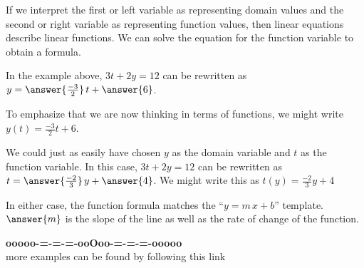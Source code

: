 \documentclass{ximera}
\begin{document}
\begin{explanation}
If we interpret the first or left variable as representing domain values and the second or right variable as representing function values, then linear equations describe linear functions.  We can solve the equation for the function variable to obtain a formula.



In the example above, $3 t + 2 y = 12$ can be rewritten as $y = \answer{\frac{-3}{2}} \, t + \answer{6}$.

To emphasize that we are now thinking in terms of functions, we might write $y(t) = \tfrac{-3}{2} t + 6$.




We could just as easily have chosen $y$ as the domain variable and $t$ as the function variable.  In this case, $3 t + 2 y = 12$ can be rewritten as $t = \answer{\frac{-2}{3}} \, y + \answer{4}$.  We might write this as $t(y) = \tfrac{-2}{3} y + 4$




In either case, the function formula matches the ``$y = m \, x + b$'' template.  $\answer{m}$ is the slope of the line as well as the rate of change of the function.


\end{explanation}



























\begin{center}
\textbf{\textcolor{green!50!black}{ooooo-=-=-=-ooOoo-=-=-=-ooooo}} \\

more examples can be found by following this link\\ 

\end{center}
\end{document}
